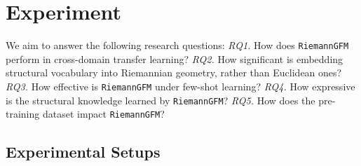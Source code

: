 




\vspace{-0.1in}
\section{Experiment}
  \vspace{-0.03in}
We aim to answer the following research questions:
\emph{RQ1.} How does \texttt{RiemannGFM} perform in  cross-domain  transfer learning?
\emph{RQ2.} How significant is embedding structural vocabulary into Riemannian geometry, rather than Euclidean ones? 
\emph{RQ3.} How effective is  \texttt{RiemannGFM} under few-shot learning?
\emph{RQ4.} How expressive is the structural knowledge learned by \texttt{RiemannGFM}?
\emph{RQ5.} How does the pre-training dataset impact  \texttt{RiemannGFM}?


\vspace{-0.05in}
\subsection{Experimental Setups}



